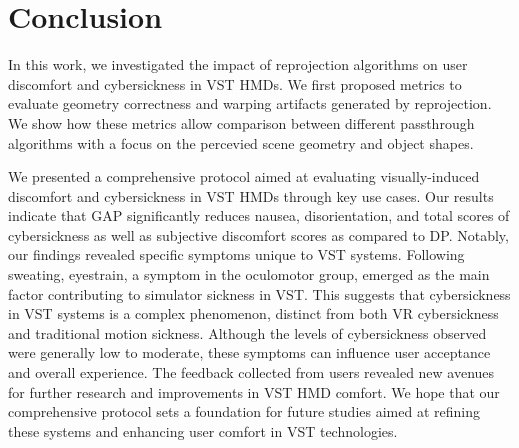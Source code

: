 \section{Conclusion}
In this work, we investigated the impact of reprojection algorithms on user discomfort and cybersickness in VST HMDs. We first proposed metrics to evaluate geometry correctness and warping artifacts generated by \depthpassthrough reprojection. We show how these metrics allow comparison between different passthrough algorithms with a focus on the percevied scene geometry and object shapes. 

We presented a comprehensive protocol aimed at evaluating visually-induced discomfort and cybersickness in VST HMDs through key use cases. Our results indicate that GAP significantly reduces nausea, disorientation, and total scores of cybersickness as well as subjective discomfort scores as compared to DP. Notably, our findings revealed specific symptoms unique to VST systems. Following sweating, eyestrain, a symptom in the oculomotor group, emerged as the main factor contributing to simulator sickness in VST. This suggests that cybersickness in VST systems is a complex phenomenon, distinct from both VR cybersickness and traditional motion sickness. Although the levels of cybersickness observed were generally low to moderate, these symptoms can influence user acceptance and overall experience. The feedback collected from users revealed new avenues for further research and improvements in VST HMD comfort. We hope that our comprehensive protocol sets a foundation for future studies aimed at refining these systems and enhancing user comfort in VST technologies.